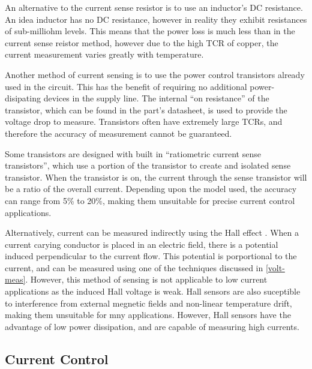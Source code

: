 An alternative to the current sense resistor is to use an inductor's DC resistance. An idea inductor has no DC resistance, however in reality they exhibit resistances of sub-milliohm levels. This means that the power loss is much less than in the current sense reistor method, however due to the high TCR of copper, the current measurement varies greatly with temperature.

Another method of current sensing is to use the power control transistors already used in the circuit. This has the benefit of requiring no additional power-disipating devices in the supply line. The internal ``on resistance'' of the transistor, which can be found in the part's datasheet, is used to provide the voltage drop to measure. Transistors often have extremely large TCRs, and therefore the accuracy of measurement cannot be guaranteed. 

Some transistors are designed with built in ``ratiometric current sense transistors'', which use a portion of the transistor to create and isolated sense transistor. When the transistor is on, the current through the sense transistor will be a ratio of the overall current. Depending upon the model used, the accuracy can range from 5\% to 20\%, making them unsuitable for precise current control applications.

Alternatively, current can be measured indirectly using the Hall effect \cite{hall}. When a current carying conductor is placed in an electric field, there is a potential induced perpendicular to the current flow. This potential is porportional to the current, and can be measured using one of the techniques discussed in \ref{volt-meas}. However, this method of sensing is not applicable to low current applications as the induced Hall voltage is weak. Hall sensors are also suceptible to interference from external megnetic fields and non-linear temperature drift, making them unsuitable for mny applications. However, Hall sensors have the advantage of low power dissipation, and are capable of measuring high currents.

\subsection{Current Control}